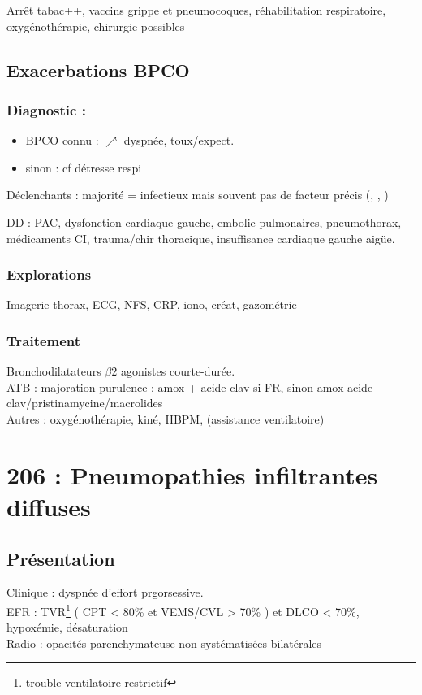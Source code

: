 \documentclass{article}
\begin{document}
Arrêt tabac++, vaccins grippe et pneumocoques, réhabilitation respiratoire, oxygénothérapie, chirurgie possibles

\subsection{Exacerbations BPCO}
\label{subsec:ebpco}
\subsubsection{Diagnostic :}
\begin{itemize}
\item BPCO connu : \(\nearrow\) dyspnée, toux/expect.
\item sinon : cf détresse respi
\end{itemize}

Déclenchants : majorité = infectieux mais souvent pas de facteur précis
(, , )

DD : PAC, dysfonction cardiaque gauche, embolie pulmonaires, pneumothorax, médicaments CI, trauma/chir thoracique, insuffisance cardiaque gauche aigüe.

\subsubsection{Explorations}
Imagerie thorax, ECG, NFS, CRP, iono, créat, gazométrie

\subsubsection{Traitement}
Bronchodilatateurs $\beta2$ agonistes courte-durée.\\
ATB : majoration purulence : amox + acide clav si FR, sinon amox-acide
clav/pristinamycine/macrolides\\
Autres \faHospitalO : oxygénothérapie, kiné, HBPM, (assistance ventilatoire)

\section{206 : Pneumopathies infiltrantes diffuses}
\subsection{Présentation}
Clinique : dyspnée d'effort prgorsessive.\\
EFR : TVR\footnote{trouble ventilatoire restrictif} ( CPT < 80\% et VEMS/CVL >
70\% ) et DLCO < 70\%, hypoxémie, désaturation\\
Radio : opacités parenchymateuse non systématisées bilatérales
\end{document}
